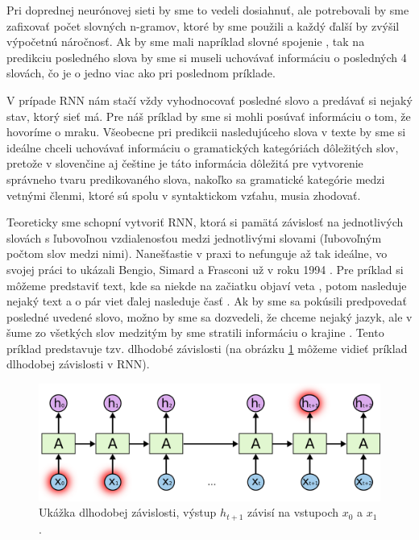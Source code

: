 Pri doprednej neurónovej sieti by sme to vedeli dosiahnuť, ale potrebovali by sme zafixovať počet slovných n-gramov, ktoré by sme použili a každý ďalší by zvýšil výpočetnú náročnosť. Ak by sme mali napríklad slovné spojenie , tak na predikciu posledného slova by sme si museli uchovávať informáciu o posledných 4 slovách, čo je o jedno viac ako pri poslednom príklade.

V prípade RNN nám stačí vždy vyhodnocovať posledné slovo a predávať si nejaký stav, ktorý sieť má. Pre náš príklad by sme si mohli posúvať informáciu o tom, že hovoríme o mraku. Všeobecne pri predikcii nasledujúceho slova v texte by sme si ideálne chceli uchovávať informáciu o gramatických kategóriách dôležitých slov, pretože v slovenčine aj češtine je táto informácia dôležitá pre vytvorenie správneho tvaru predikovaného slova, nakoľko sa gramatické kategórie medzi vetnými členmi, ktoré sú spolu v syntaktickom vzťahu, musia zhodovať.

Teoreticky sme schopní vytvoriť RNN, ktorá si pamätá závislosť na jednotlivých slovách s ľubovoľnou vzdialenosťou medzi jednotlivými slovami (ľubovoľným počtom slov medzi nimi). Nanešťastie v praxi to nefunguje až tak ideálne, vo svojej práci to ukázali Bengio, Simard a Frasconi už v roku 1994 \citep{rnn:bengio}.
Pre príklad si môžeme predstaviť text, kde sa niekde na začiatku objaví veta , potom nasleduje nejaký text a o pár viet ďalej nasleduje časť . Ak by sme sa pokúsili predpovedať posledné uvedené slovo, možno by sme sa dozvedeli, že chceme nejaký jazyk, ale v šume zo všetkých slov medzitým by sme stratili informáciu o krajine \citep{rnn:colah}.
Tento príklad predstavuje tzv. dlhodobé závislosti (na obrázku \ref{rnn:ltd} môžeme vidieť príklad dlhodobej závislosti v RNN).


\begin{figure}  [h!]
\includegraphics[width=\textwidth]{../img/rnn_ltd.png}
\caption{Ukážka dlhodobej závislosti, výstup $h_{t+1}$ závisí na vstupoch $x_0$ a $x_1$ \citep{rnn:colah}.}
\label{rnn:ltd}
\end{figure}

